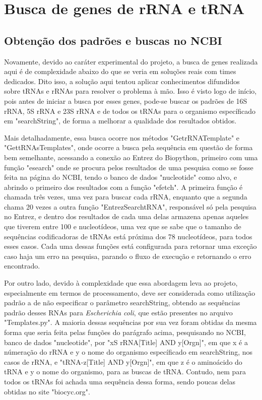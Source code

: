 \documentclass[brazilian,12pt,a4paper,final]{article}
\begin{document}
\section{Busca de genes de rRNA e tRNA}
\subsection{Obtenção dos padrões e buscas no NCBI}
Novamente, devido ao caráter experimental do projeto, a busca de genes realizada aqui é de complexidade abaixo do que se veria em soluções reais com times dedicados. Dito isso, a solução aqui tentou aplicar conhecimentos difundidos sobre tRNAs e rRNAs para resolver o problema à mão. Isso é visto logo de início, pois antes de iniciar a busca por esses genes, pode-se buscar os padrões de 16S rRNA, 5S rRNA e 23S rRNA e de todos os tRNAs para o organismo específicado em "searchString", de forma a melhorar a qualidade dos resultados obtidos. 

\vspace{0.5cm}

Mais detalhadamente, essa busca ocorre nos métodos "GetrRNATemplate" e "GettRNAsTemplates", onde ocorre a busca pela sequência em questão de forma bem semelhante, acessando a conexão ao Entrez do Biopython, primeiro com uma função "esearch" onde se procura pelos resultados de uma pesquisa como se fosse feita na página do NCBI, tendo o banco de dados "nucleotide" como alvo, e abrindo o primeiro dos resultados com a função "efetch". A primeira função é chamada três vezes, uma vez para buscar cada rRNA, enquanto que a segunda chama 20 vezes a outra função "EntrezSearchtRNA", responsável só pela pesquisa no Entrez, e dentro dos resultados de cada uma delas armazena apenas aqueles que tiverem entre 100 e nucleotídeos, uma vez que se sabe que o tamanho de sequências codificadoras de tRNAs está próxima dos 78 nucleotídeos, para todos esses casos. Cada uma dessas funções está configurada para retornar uma exceção caso haja um erro na pesquisa, parando o fluxo de execução e retornando o erro encontrado.

\vspace{0.5cm}

Por outro lado, devido à complexidade que essa abordagem leva ao projeto, especialmente em termos de processamento, deve ser considerada como utilização padrão a de não especificar o parâmetro searchString, obtendo as sequências padrão desses RNAs para \textit{Escherichia coli}, que estão presentes no arquivo "Templates.py". A maioria dessas sequências por sua vez foram obtidas da mesma forma que seria feita pelas funções do parágrafo acima, pesquisando no NCBI, banco de dados "nucleotide", por "{x}S rRNA[Title] AND {y}[Orgn]", em que x é a númeração do rRNA e y o nome do organismo específicado em searchString, nos casos de rRNA, e "tRNA-{z}[Title] AND y[Orgn]", em que z é o aminoácido do tRNA e y o nome do organismo, para as buscas de tRNA. Contudo, nem para todos os tRNAs foi achada uma sequência dessa forma, sendo poucas delas obtidas no site "biocyc.org".
\end{document}
